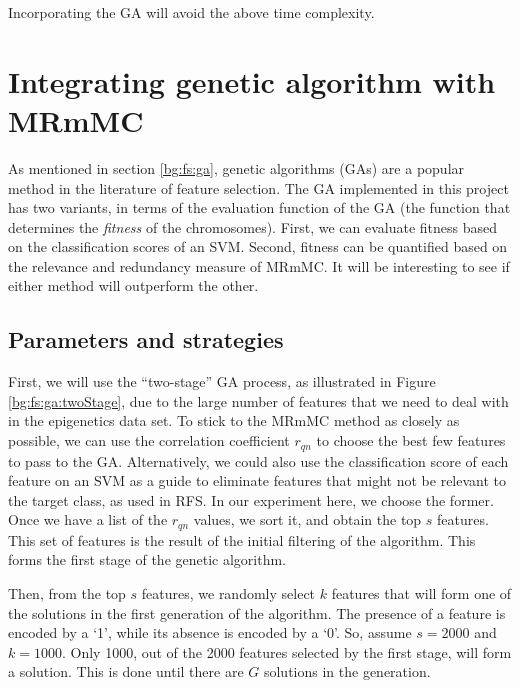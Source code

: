 \documentclass[12pt, twoside, a4paper]{report}
\begin{document}
Incorporating the GA will avoid the above time complexity.





\section{Integrating genetic algorithm with MRmMC} \label{ga:mrmmc}

As mentioned in section \ref{bg:fs:ga}, genetic algorithms (GAs) are a popular method in the literature of feature selection. The GA implemented in this project has two variants, in terms of the evaluation function of the GA (the function that determines the \textit{fitness} of the chromosomes). First, we can evaluate fitness based on the classification scores of an SVM. Second, fitness can be quantified based on the relevance and redundancy measure of MRmMC. It will be interesting to see if either method will outperform the other.

\subsection{Parameters and strategies}
\label{body:ga:params}

First, we will use the ``two-stage'' GA process, as illustrated in Figure \ref{bg:fs:ga:twoStage}, due to the large number of features that we need to deal with in the epigenetics data set. To stick to the MRmMC method as closely as possible, we can use the correlation coefficient $r_{qn}$ to choose the best few features to pass to the GA. Alternatively, we could also use the classification score of each feature on an SVM as a guide to eliminate features that might not be relevant to the target class, as used in RFS. In our experiment here, we choose the former. Once we have a list of the $r_{qn}$ values, we sort it, and obtain the top $s$ features. This set of features is the result of the initial filtering of the algorithm. This forms the first stage of the genetic algorithm.

Then, from the top $s$ features, we randomly select $k$ features that will form one of the solutions in the first generation of the algorithm. The presence of a feature is encoded by a `1', while its absence is encoded by a `0'. So, assume $s=2000$ and $k=1000$. Only 1000, out of the 2000 features selected by the first stage, will form a solution. This is done until there are $G$ solutions in the generation.
\end{document}

